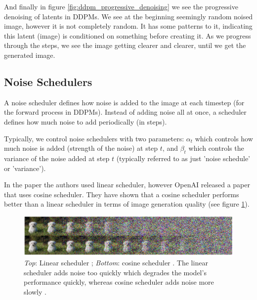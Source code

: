 And finally in figure \ref{fig:ddpm_progressive_denoising} we see the progressive denoising of latents in DDPMs. We see at the beginning seemingly random noised image, however it is not completely random. It has some patterns to it, indicating this latent (image) is conditioned on something before creating it. As we progress through the steps, we see the image getting clearer and clearer, until we get the generated image.






\subsection{Noise Schedulers}

A noise scheduler defines how noise is added to the image at each timestep (for the forward process in DDPMs). Instead of adding noise all at once, a scheduler defines how much noise to add periodically (in steps).

Typically, we control noise schedulers with two parameters: $\alpha_t$ which controls how much noise is added (strength of the noise) at step $t$, and $\beta_t$ which controls the variance  of the noise added at step $t$ (typically referred to as just 'noise schedule' or 'variance').

In the paper \cite{ddpm} the authors used linear scheduler, however OpenAI released a paper \cite{openai_improved_ddpm} that uses cosine scheduler. They have shown that a cosine scheduler performs better than a linear scheduler in terms of image generation quality (see figure \ref{fig:linear_cosine_scheduler}).

\begin{figure}
    \centering
    \includegraphics[width=1\textwidth]{images/diffusion_models/linear_cosine_scheduler.png}
    \caption{\textit{Top}: Linear scheduler \cite{ddpm}; \textit{Bottom}: cosine scheduler \cite{openai_improved_ddpm}. The linear scheduler adds noise too quickly which degrades the model's performance quickly, whereas cosine scheduler adds noise more slowly \cite{openai_improved_ddpm}.}
    \label{fig:linear_cosine_scheduler}
\end{figure}

